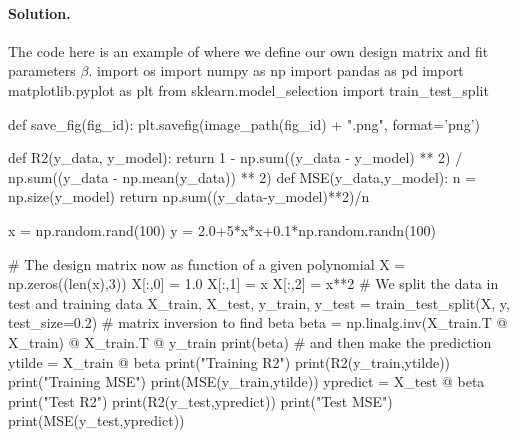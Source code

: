 \documentclass[%
oneside,                 %
final,                   %
10pt]{article}
\newenvironment{doconceexercise}{}{}
\begin{document}
\begin{doconceexercise}
\paragraph{Solution.}
The code here is an example of where we define our own design matrix and fit parameters $\beta$.
\bpycod
import os
import numpy as np
import pandas as pd
import matplotlib.pyplot as plt
from sklearn.model_selection import train_test_split

def save_fig(fig_id):
    plt.savefig(image_path(fig_id) + ".png", format='png')

def R2(y_data, y_model):
    return 1 - np.sum((y_data - y_model) ** 2) / np.sum((y_data - np.mean(y_data)) ** 2)
def MSE(y_data,y_model):
    n = np.size(y_model)
    return np.sum((y_data-y_model)**2)/n

x = np.random.rand(100)
y = 2.0+5*x*x+0.1*np.random.randn(100)


#  The design matrix now as function of a given polynomial
X = np.zeros((len(x),3))
X[:,0] = 1.0
X[:,1] = x
X[:,2] = x**2
# We split the data in test and training data
X_train, X_test, y_train, y_test = train_test_split(X, y, test_size=0.2)
# matrix inversion to find beta
beta = np.linalg.inv(X_train.T @ X_train) @ X_train.T @ y_train
print(beta)
# and then make the prediction
ytilde = X_train @ beta
print("Training R2")
print(R2(y_train,ytilde))
print("Training MSE")
print(MSE(y_train,ytilde))
ypredict = X_test @ beta
print("Test R2")
print(R2(y_test,ypredict))
print("Test MSE")
print(MSE(y_test,ypredict))
\epycod


\end{doconceexercise}
\end{document}
